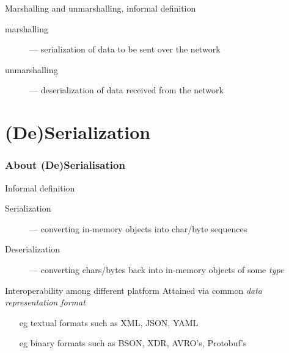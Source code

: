 \documentclass[presentation]{beamer}\mode<presentation>{\usetheme{AMSBolognaFC}}
\begin{document}
\begin{frame}[allowframebreaks]
    \begin{block}{Marshalling and unmarshalling, informal definition}
        \begin{description}
            \item[marshalling] --- serialization of data to be sent over the network

            \item[unmarshalling] --- deserialization of data received from the network
        \end{description}
    \end{block}

\end{frame}

\section{(De)Serialization}

\begin{frame}[allowframebreaks]
    \frametitle{About (De)Serialisation}

    \begin{block}{Informal definition}
        \begin{description}
            \item[Serialization] --- converting in-memory objects into char/byte sequences
            \item[Deserialization] --- converting chars/bytes back into in-memory objects of some \emph{type}
        \end{description}
    \end{block}

    \bigskip

    \begin{alertblock}{Interoperability among different platform}
        Attained via common \emph{data representation format}
        \begin{itemize}
            \item[eg] textual formats such as XML, JSON, YAML
            \item[eg] binary formats such as BSON, XDR, AVRO's, Protobuf's
        \end{itemize}
    \end{alertblock}

\end{frame}
\end{document}
